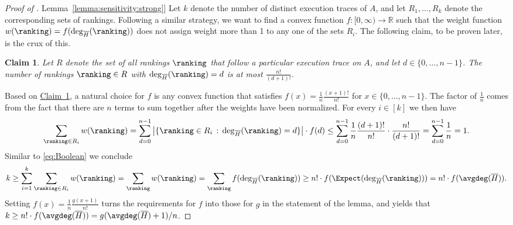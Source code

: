 \documentclass[11pt]{article}
\numberwithin{equation}{section}
\newtheorem{claim}[theorem]{Claim}
\theoremstyle{definition}
\theoremstyle{plain}
\newcommand{\R}{\mathbb R}
\newcommand{\expref}[2]{\hyperref[#2]{#1~\ref{#2}}}
\begin{document}
\begin{proof}[Proof of \expref{Lemma}{lemma:sensitivity:strong}]
Let $k$ denote the number of distinct execution traces of $A$, and let $R_1, \dots, R_k$ denote the corresponding sets of rankings. 
Following a similar strategy, we want to find a convex function $f: [0,\infty)\to \R$ such that the weight function $w(\ranking) = f(\deg_{\overline{H}}(\ranking))$ does not assign weight more than 1 to any one of the sets $R_i$. The following claim, to be proven later, is the crux of this.

\begin{claim}\label{claim:encoding}
Let $R$ denote the set of all rankings $\ranking$ that follow a particular execution trace on $A$, and let $d \in \{0,\dots,n-1\}$. The number of rankings $\ranking \in R$ with $\deg_{\overline{H}}(\ranking) = d$ is at most $\frac{n!}{(d+1)!}$.
\end{claim}

Based on \expref{Claim}{claim:encoding}, a natural choice for $f$ is any convex function that satisfies $f(x) = \frac{1}{n} \frac{(x+1)!}{n!}$ for $x \in \{0,\dots,n-1\}$. The factor of $\frac{1}{n}$ comes from the fact that there are $n$ terms to sum together after the weights have been normalized. For every $i \in [k]$ we then have
\[ \sum_{\ranking \in R_i} w(\ranking) = \sum_{d=0}^{n-1} \left| \{ \ranking \in R_i \, : \, \deg_{\overline{H}}(\ranking) = d \} \right| \cdot f(d) \le \sum_{d=0}^{n-1} \frac{1}{n} \frac{(d+1)!}{n!} \cdot \frac{n!}{(d+1)!} = \sum_{d=0}^{n-1} \frac{1}{n} = 1. \]
Similar to \eqref{eq:Boolean} we conclude
\begin{equation}\label{eq:lb:k}
k \ge \sum_{i=1}^k \sum_{\ranking \in R_i} w(\ranking) 
= \sum_\ranking w(\ranking)
= \sum_\ranking f(\deg_{\overline{H}}(\ranking)) \ge n! \cdot f(\Expect(\deg_{\overline{H}}(\ranking))) = n! \cdot f(\avgdeg(\overline{H})). 
\end{equation}
Setting $f(x) = \frac{1}{n} \frac{g(x+1)}{n!}$ turns the requirements for $f$ into those for $g$ in the statement of the lemma, and yields that $k \ge n! \cdot f(\avgdeg(\overline{H})) = g(\avgdeg(\overline{H})+1)/n$. 
\end{proof}
\end{document}

